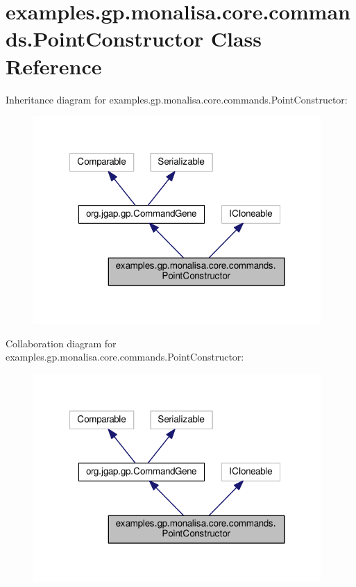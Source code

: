 \hypertarget{classexamples_1_1gp_1_1monalisa_1_1core_1_1commands_1_1_point_constructor}{\section{examples.\-gp.\-monalisa.\-core.\-commands.\-Point\-Constructor Class Reference}
\label{classexamples_1_1gp_1_1monalisa_1_1core_1_1commands_1_1_point_constructor}
}


Inheritance diagram for examples.\-gp.\-monalisa.\-core.\-commands.\-Point\-Constructor\-:
\nopagebreak
\begin{figure}[H]
\begin{center}
\leavevmode
\includegraphics[width=311pt]{classexamples_1_1gp_1_1monalisa_1_1core_1_1commands_1_1_point_constructor__inherit__graph}
\end{center}
\end{figure}


Collaboration diagram for examples.\-gp.\-monalisa.\-core.\-commands.\-Point\-Constructor\-:
\nopagebreak
\begin{figure}[H]
\begin{center}
\leavevmode
\includegraphics[width=311pt]{classexamples_1_1gp_1_1monalisa_1_1core_1_1commands_1_1_point_constructor__coll__graph}
\end{center}
\end{figure}
